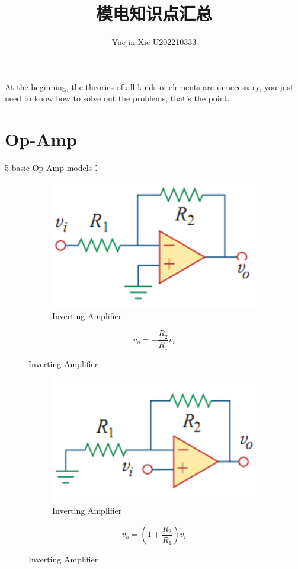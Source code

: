 \documentclass[a4paper,11pt,UTF8]{article}
\title{模电知识点汇总}
\author{Yuejin Xie \quad U202210333}
\date{}
\begin{document}
\maketitle
At the beginning, the theories of all kinds of elements are unnecessary, you just need to know how to solve out the problems, that's the point.
\section{Op-Amp}
5 basic Op-Amp models：

\begin{figure}[H]
	\begin{minipage}{.69\textwidth}
		\begin{figure}[H] 
			\centering 
			\includegraphics[scale=0.5]{./img/9.1.png}
			\caption{Inverting Amplifier}
		\end{figure}
	\end{minipage}
	\begin{minipage}{.29\textwidth}
		\LARGE{$$
			v_o=-\frac{R_2}{R_1}v_i
			$$}
	\end{minipage}
\end{figure}

\begin{figure}[H]
	\begin{minipage}{.5\textwidth}
		\begin{figure}[H] 
			\centering 
			\includegraphics[scale=0.5]{./img/9.2.png}
			\caption{Inverting Amplifier}
		\end{figure}
	\end{minipage}
	\begin{minipage}{.5\textwidth}
		\LARGE{$$
			v_o=(1+\frac{R_2}{R_1})v_i
			$$}
	\end{minipage}
\end{figure}
\end{document}
